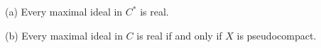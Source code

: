(a) Every maximal ideal in $C^*$ is real.

(b) Every maximal ideal in $C$ is real if and only if $X$ is pseudocompact.

